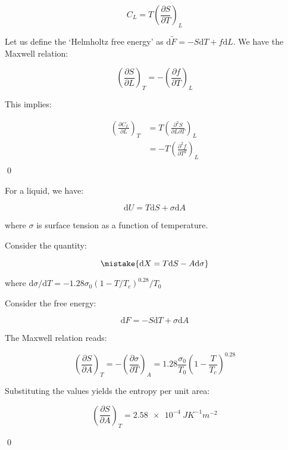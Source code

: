 \documentclass[12pt]{article}
\begin{document}
\begin{equation}
    C_{L} = T \left( \frac{\partial S}{\partial T} \right)_{L}
\end{equation}

Let us define the `Helmholtz free energy' as $\mathrm{d}\tilde{F} = -S\mathrm{d}T + f\mathrm{d}L$. We have the Maxwell relation:

\begin{equation}
    \left( \frac{\partial S}{\partial L} \right)_{T} = -\left( \frac{\partial f}{\partial T} \right)_{L}
\end{equation}

This implies:

\begin{equation}
    \begin{split}
        \left( \frac{\partial C_{L}}{\partial L} \right)_{T} &= T \left( \frac{\partial^{2} S}{\partial L \partial T} \right)_{L} \\
        &= -T \left( \frac{\partial^{2} f}{\partial T^{2}} \right)_{L} \\
    \end{split}
\end{equation}
\qed


For a liquid, we have:

\begin{equation}
    \mathrm{d}U = T\mathrm{d}S + \sigma\mathrm{d}A
\end{equation}

where $\sigma$ is surface tension as a function of temperature.

Consider the quantity:

\begin{equation}
    \mistake{\mathrm{d}X = T\mathrm{d}S - A\mathrm{d}\sigma}
\end{equation}

where $\mathrm{d}\sigma/\mathrm{d}T = -1.28\sigma_{0}(1 - T/T_{c})^{0.28}/T_{0}$

\begin{correction}
    Consider the free energy:

    \begin{equation}
        \mathrm{d}F = -S\mathrm{d}T + \sigma\mathrm{d}A
    \end{equation}

    The Maxwell relation reads:

    \begin{equation}
        \left( \frac{\partial S}{\partial A} \right)_{T} = -\left( \frac{\partial \sigma}{\partial T} \right)_{A} = 1.28 \frac{\sigma_{0}}{T_{0}} \left( 1 - \frac{T}{T_{c}} \right)^{0.28}
    \end{equation}

    Substituting the values yields the entropy per unit area:

    \begin{equation}
        \left( \frac{\partial S}{\partial A} \right)_{T} = \qty{2.58e-4}{JK^{-1}m^{-2}}
    \end{equation}
\end{correction}
\qed
\end{document}
